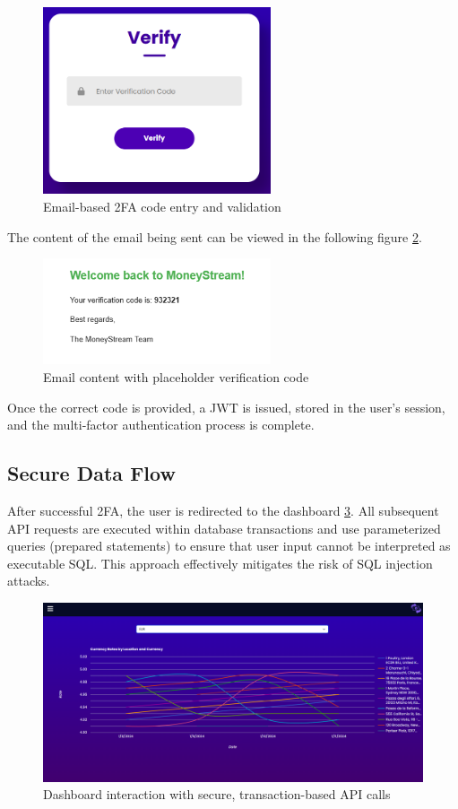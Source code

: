 \begin{figure}[h]
  \centering
  \includegraphics[width=0.6\textwidth]{figs/verify.png}
  \caption{Email-based 2FA code entry and validation}
  \label{fig:verify}
\end{figure}
The content of the email being sent can be viewed in the following figure \ref{fig:email}.
\begin{figure}[h]
  \centering
  \includegraphics[width=0.6\textwidth]{figs/email.png}
  \caption{Email content with placeholder verification code}
  \label{fig:email}
\end{figure}
Once the correct code is provided, a JWT is issued, stored in the user’s session, and the multi‑factor authentication process is complete.
\newpage
\subsection{Secure Data Flow}
After successful 2FA, the user is redirected to the dashboard \ref{fig:dashboard}. All subsequent API requests are executed within database transactions and use parameterized queries (prepared statements) to ensure that user input cannot be interpreted as executable SQL. This approach effectively mitigates the risk of SQL injection attacks.

\begin{figure}[h]
  \centering
  \includegraphics[width=1\textwidth]{figs/dashboard.png}
  \caption{Dashboard interaction with secure, transaction-based API calls}
  \label{fig:dashboard}
\end{figure}
